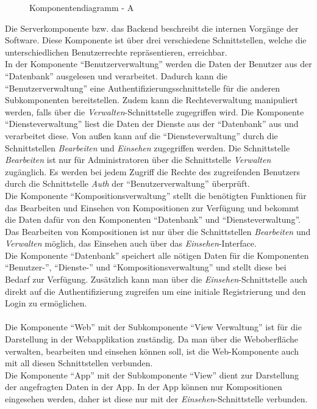 \begin{figure}[h]
	\centering
	\caption{Komponentendiagramm - A}
	\label{fig:komponentendiagramm-a}
\end{figure}

\noindent
Die Serverkomponente bzw. das Backend beschreibt die internen Vorgänge der Software.
Diese Komponente ist über drei verschiedene Schnittstellen, welche die unterschiedlichen
Benutzerrechte repräsentieren, erreichbar.\\
In der Komponente ``Benutzerverwaltung'' werden die Daten der Benutzer aus der ``Datenbank'' ausgelesen und verarbeitet.
Dadurch kann die ``Benutzerverwaltung'' eine Authentifizierungsschnittstelle für die anderen Subkomponenten bereitstellen.
Zudem kann die Rechteverwaltung manipuliert werden, falls über die \textit{Verwalten}-Schnittstelle zugegriffen wird.
Die Komponente ``Diensteverwaltung'' liest die Daten der Dienste aus der ``Datenbank'' aus und verarbeitet diese.
Von außen kann auf die ``Diensteverwaltung'' durch die Schnittstellen \textit{Bearbeiten} und \textit{Einsehen} zugegriffen werden.
Die Schnittstelle \textit{Bearbeiten} ist nur für Administratoren über die Schnittstelle \textit{Verwalten} zugänglich.
Es werden bei jedem Zugriff die Rechte des zugreifenden Benutzers durch die Schnittstelle \textit{Auth} der ``Benutzerverwaltung'' überprüft.\\
Die Komponente ``Kompositionsverwaltung'' stellt die benötigten Funktionen für das Bearbeiten und Einsehen von Kompositionen zur Verfügung und bekommt die Daten dafür von den Komponenten ``Datenbank'' und ``Diensteverwaltung''.
Das Bearbeiten von Kompositionen ist nur über die Schnittstellen \textit{Bearbeiten} und \textit{Verwalten} möglich, das Einsehen auch über das \textit{Einsehen}-Interface.\\
Die Komponente ``Datenbank'' speichert alle nötigen Daten für die Komponenten ``Benutzer-'', ``Dienste-'' und ``Kompositionsverwaltung'' und stellt diese bei Bedarf zur Verfügung.
Zusätzlich kann man über die \textit{Einsehen}-Schnittstelle auch direkt auf die Authentifizierung zugreifen um eine initiale Registrierung und den Login zu ermöglichen.\\
\\
Die Komponente ``Web'' mit der Subkomponente ``View Verwaltung'' ist für die Darstellung in der Webapplikation zuständig.
Da man über die Weboberfläche verwalten, bearbeiten und einsehen können soll, ist die Web-Komponente auch mit all diesen Schnittstellen verbunden.\\
Die Komponente ``App'' mit der Subkomponente ``View'' dient zur Darstellung der angefragten Daten in der App.
In der App können nur Kompositionen eingesehen werden, daher ist diese nur mit der \textit{Einsehen}-Schnittstelle verbunden.
